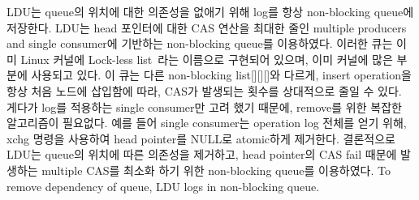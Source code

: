 \ifkor
LDU는 queue의 위치에 대한 의존성을 없애기 위해 log를 항상 non-blocking queue에
저장한다.
LDU는 head 포인터에 대한 CAS 연산을 최대한 줄인 multiple producers and single
consumer에 기반하는 non-blocking queue를 이용하였다.
이러한 큐는 이미 Linux 커널에 Lock-less list~\cite{HuangLocklessList}라는 이름으로 구현되어 있으며, 이미
커널에 많은 부분에 사용되고 있다.
이 큐는 다른 non-blocking list[][][]와 다르게, insert operation을 항상 처음 노드에 삽입함에
따라, CAS가 발생되는 횟수를 상대적으로 줄일 수 있다.
게다가 log를 적용하는 single consumer만 고려 했기 때문에, remove를 위한 복잡한 알고리즘이 필요없다. 
예를 들어 single consumer는 operation log 전체를 얻기 위해, xchg 명령을 사용하여 head pointer를
NULL로 atomic하게 제거한다. 
결론적으로 LDU는 queue의 위치에 따른 의존성을 제거하고, head pointer의 CAS fail 때문에 발생하는 multiple
CAS를 최소화 하기 위한 non-blocking queue를 이용하였다.
\else
To remove dependency of queue, LDU logs in non-blocking queue.













\fi


